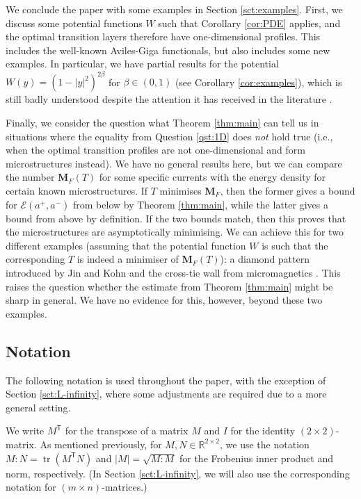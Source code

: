 \documentclass[a4paper]{article}
\newcommand{\R}{\mathbb{R}}
\newcommand{\M}{\mathbf{M}}
\newcommand{\transpose}{\mathsf{T}}
\DeclareMathOperator{\tr}{tr}
\theoremstyle{definition}
\theoremstyle{remark}
\begin{document}
We conclude the paper with some examples in Section \ref{sct:examples}. First, we discuss some potential
functions $W$ such that Corollary \ref{cor:PDE} applies, and the optimal transition layers therefore
have one-dimensional profiles. This includes the well-known Aviles-Giga functionals, but also includes some new examples. In particular, we have
partial results for
the potential $W(y) = (1 - |y|^2)^{2\beta}$ for $\beta \in (0, 1)$ (see Corollary \ref{cor:examples}), which
is still badly understood despite the attention it has received in the literature
\cite{Aviles-Giga:99, Ambrosio-DeLellis-Mantegazza:99}.

Finally, we consider the question what Theorem \ref{thm:main} can tell us
in situations where the equality from Question \ref{qst:1D} does \emph{not} hold true (i.e., when the optimal transition profiles are not one-dimensional
and form microstructures instead).
We have no general results here, but we can compare the number $\M_F(T)$ for some specific
currents with the energy density for certain known microstructures.
If $T$ minimises $\M_F$, then the former gives a bound for $\mathcal{E}(a^+, a^-)$ from below by Theorem \ref{thm:main},
while the latter gives a
bound from above by definition. If the two bounds match, then
this proves that the microstructures are asymptotically minimising.
We can achieve this for two different examples (assuming that the potential
function $W$ is such that the corresponding $T$ is indeed a minimiser of $\M_F(T)$): a diamond pattern introduced by Jin and Kohn \cite{Jin-Kohn:00}
and the cross-tie wall from micromagnetics \cite{DeSimone-Kohn-Mueller-Otto:03}.
This raises the question whether the estimate from Theorem \ref{thm:main} might be sharp
in general. We have no evidence for this, however, beyond these two examples.








\subsection{Notation}

The following notation is used throughout the paper, with the exception of Section \ref{sct:L-infinity},
where some adjustments are required due to a more general setting.

We write $M^\transpose$ for the transpose of a matrix $M$ and
$I$ for the identity $(2 \times 2)$-matrix.
As mentioned previously, for $M, N \in \R^{2 \times 2}$, we use the notation $M : N = \tr(M^\transpose N)$ and $|M| = \sqrt{M : M}$
for the Frobenius inner product and norm, respectively. (In Section \ref{sct:L-infinity}, we will
also use the corresponding notation for $(m \times n)$-matrices.)
\end{document}
